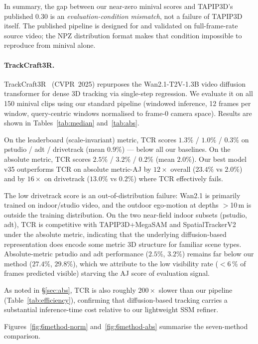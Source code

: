 \documentclass[11pt,a4paper]{article}
\begin{document}
In summary, the gap between our near-zero minival scores and TAPIP3D's published 0.30 is an
\emph{evaluation-condition mismatch}, not a failure of TAPIP3D itself.
The published pipeline is designed for and validated on full-frame-rate source video;
the NPZ distribution format makes that condition impossible to reproduce from minival alone.

\paragraph{TrackCraft3R.}
\label{sec:trackcraft3r}
TrackCraft3R~\cite{trackcraft3r} (CVPR~2025) repurposes the Wan2.1-T2V-1.3B video diffusion
transformer for dense 3D tracking via single-step regression.
We evaluate it on all 150 minival clips using our standard pipeline (windowed inference,
12 frames per window, query-centric windows normalised to frame-0 camera space).
Results are shown in Tables~\ref{tab:median} and~\ref{tab:abs}.

On the leaderboard (scale-invariant) metric, TCR scores $1.3\%$ / $1.0\%$ / $0.3\%$
on pstudio / adt / drivetrack (mean $0.9\%$) --- below all our baselines.
On the absolute metric, TCR scores $2.5\%$ / $3.2\%$ / $0.2\%$ (mean $2.0\%$).
Our best model v35 outperforms TCR on absolute metric-AJ by $12\times$ overall
($23.4\%$ vs $2.0\%$) and by $16\times$ on drivetrack ($13.0\%$ vs $0.2\%$) where TCR
effectively fails.

The low drivetrack score is an out-of-distribution failure: Wan2.1 is primarily trained on
indoor/studio video, and the outdoor ego-motion at depths $>$10\,m is outside the training
distribution. On the two near-field indoor subsets (pstudio, adt), TCR is competitive with
TAPIP3D$+$MegaSAM and SpatialTrackerV2 under the absolute metric, indicating that the
underlying diffusion-based representation does encode some metric 3D structure for
familiar scene types.
Absolute-metric pstudio and adt performance ($2.5\%$, $3.2\%$) remains far below our
method ($27.4\%$, $29.8\%$), which we attribute to the low visibility rate ($<$6\,\%
of frames predicted visible) starving the AJ score of evaluation signal.

As noted in \S\ref{sec:abs}, TCR is also roughly $200\times$ slower than our pipeline
(Table~\ref{tab:efficiency}), confirming that diffusion-based tracking carries a
substantial inference-time cost relative to our lightweight SSM refiner.

Figures~\ref{fig:6method-norm} and~\ref{fig:6method-abs} summarise the seven-method comparison.
\end{document}
